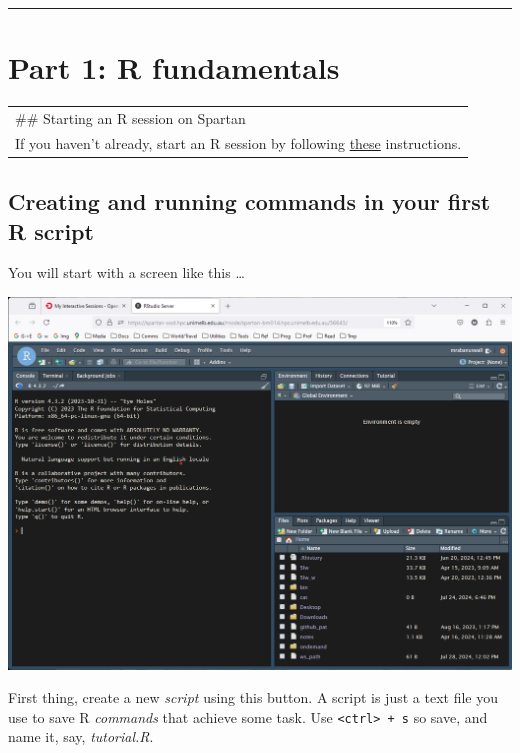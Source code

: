 \documentclass[
]{article}
\begin{document}
\begin{center}\rule{0.5\linewidth}{0.5pt}\end{center}

\section{Part 1: R fundamentals}\label{part-1-r-fundamentals}

\begin{longtable}[]{@{}
  >{\raggedright\arraybackslash}p{}@{}}
\toprule\noalign{}
\endhead
\bottomrule\noalign{}
\endlastfoot
\#\# Starting an R session on Spartan \\
If you haven't already, start an R session by following
\href{tutorial_Rstart.html}{these} instructions. \\
\end{longtable}

\subsection{Creating and running commands in your first R
script}\label{creating-and-running-commands-in-your-first-r-script}

You will start with a screen like this \ldots{}

\includegraphics{images/RstudioScreen.png}

First thing, create a new \emph{script} using this button. A script is
just a text file you use to save R \emph{commands} that achieve some
task. Use \texttt{\textless{}ctrl\textgreater{}\ +\ s} so save, and name
it, say, \emph{tutorial.R}.
\end{document}
